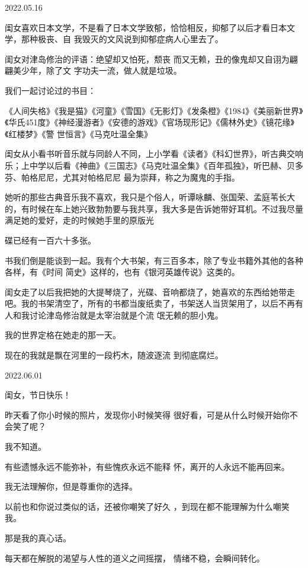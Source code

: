 \documentclass{article}
\begin{document}
2022.05.16 

闺女喜欢日本文学，不是看了日本文学致郁，恰恰相反，抑郁了以后才看日本文学，那种极丧、自
我毁灭的文风说到抑郁症病人心里去了。 

闺女对津岛修治的评语：绝望却又怕死，颓丧
\newpage
而又无赖，丑的像鬼却又自诩为翩翩美少年，除了文
字功夫一流，做人就是垃圾。 


我们一起讨论过的书目： 

《人间失格》《我是猫》《河童》《雪国》《无影灯》《发条橙》《1984》《美丽新世界》《华氏451度》《神经漫游者》《安德的游戏》《官场现形记》《儒林外史》《镜花缘》《红楼梦》《警
世恒言》《马克吐温全集》 

闺女从小看书听音乐就与同龄人不同，上小学看《读者》《科幻世界》，听古典交响乐；上中学以后看《神曲》《三国志》《马克吐温全集》《百年孤独》，听巴赫、贝多芬、帕格尼尼，尤其对帕格尼尼
最为崇拜，称之为魔鬼的手指。 

她听的那些古典音乐我不喜欢，我只是个俗人，听谭咏麟、张国荣、孟庭苇长大的，有时候在车上她兴致勃勃要与我共享，我大多是告诉她带好耳机。不过我尽量满足她的爱好，走的时候她手里的原版光
\newpage

碟已经有一百六十多张。 

书我们倒是能谈到一起。我有个大书架，有三百多本，除了专业书籍外其他的各种各样，有《时间
简史》这样的，也有《银河英雄传说》这类的。 

闺女走了以后我把她的大提琴烧了，光碟、音响都烧了，她喜欢的东西给她带走吧。我的书架清空了，所有的书都当废纸卖了，书架送人当货架用了，以后不再有人和我讨论津岛修治就是太宰治就是个流
氓无赖的胆小鬼。 


我的世界定格在她走的那一天。 

现在的我就是飘在河里的一段朽木，随波逐流
到彻底腐烂。 



2022.06.01 


\newpage

闺女，节日快乐！ 

昨天看了你小时候的照片，发现你小时候笑得
很好看，可是从什么时候开始你不会笑了呢？ 


我不知道。 

有些遗憾永远不能弥补，有些愧疚永远不能释
怀，离开的人永远不能再回来。 


我无法理解你，但是尊重你的选择。 

以前也和你说过类似的话，还被你嘲笑了好久
，到现在都不能理解为什么嘲笑我。 


那是我的真心话。 

每天都在解脱的渴望与人性的道义之间摇摆，
情绪不稳，会瞬间转化。 
\end{document}
